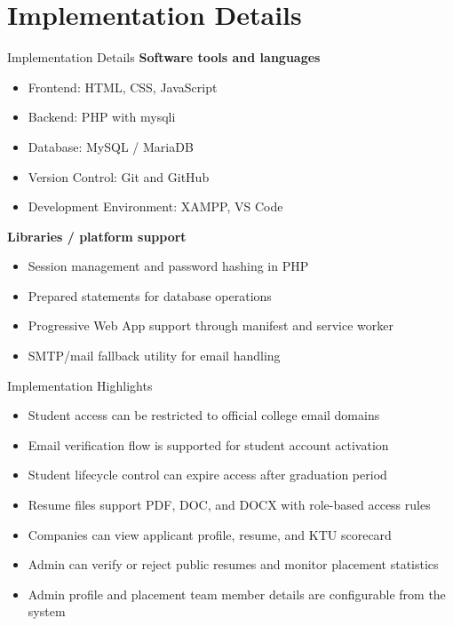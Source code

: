 \documentclass{beamer}
\begin{document}
\section{Implementation Details}
\begin{frame}{Implementation Details}
\small
\textbf{Software tools and languages}
\begin{itemize}
\item Frontend: HTML, CSS, JavaScript
\item Backend: PHP with mysqli
\item Database: MySQL / MariaDB
\item Version Control: Git and GitHub
\item Development Environment: XAMPP, VS Code
\end{itemize}

\textbf{Libraries / platform support}
\begin{itemize}
\item Session management and password hashing in PHP
\item Prepared statements for database operations
\item Progressive Web App support through manifest and service worker
\item SMTP/mail fallback utility for email handling
\end{itemize}
\end{frame}

\begin{frame}{Implementation Highlights}
\small
\begin{itemize}
\item Student access can be restricted to official college email domains
\item Email verification flow is supported for student account activation
\item Student lifecycle control can expire access after graduation period
\item Resume files support PDF, DOC, and DOCX with role-based access rules
\item Companies can view applicant profile, resume, and KTU scorecard
\item Admin can verify or reject public resumes and monitor placement statistics
\item Admin profile and placement team member details are configurable from the system
\end{itemize}
\end{frame}
\end{document}
